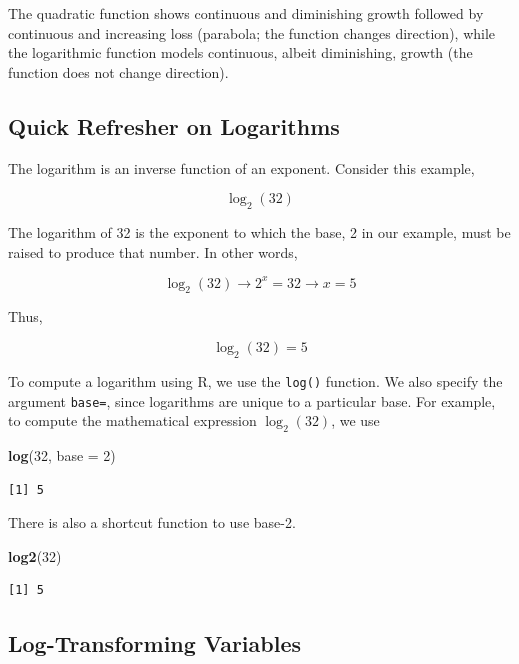 \documentclass[]{book}
\newenvironment{Shaded}{\begin{snugshade}}{\end{snugshade}}
\newcommand{\DataTypeTok}[1]{\textcolor[rgb]{0.13,0.29,0.53}{#1}}
\newcommand{\DecValTok}[1]{\textcolor[rgb]{0.00,0.00,0.81}{#1}}
\newcommand{\KeywordTok}[1]{\textcolor[rgb]{0.13,0.29,0.53}{\textbf{#1}}}
\newcommand{\NormalTok}[1]{#1}
\begin{document}
The quadratic function shows continuous and diminishing growth followed by continuous and increasing loss (parabola; the function changes direction), while the logarithmic function models continuous, albeit diminishing, growth (the function does not change direction).

\hypertarget{quick-refresher-on-logarithms}{%
\subsection{Quick Refresher on Logarithms}\label{quick-refresher-on-logarithms}}

The logarithm is an inverse function of an exponent. Consider this example,

\[
\log_2 (32)
\]

The logarithm of 32 is the exponent to which the base, 2 in our example, must be raised to produce that number. In other words,

\[
\log_2 (32) \longrightarrow 2^{x} = 32 \longrightarrow x=5
\]

Thus,

\[
\log_2 (32) = 5
\]

To compute a logarithm using R, we use the \texttt{log()} function. We also specify the argument \texttt{base=}, since logarithms are unique to a particular base. For example, to compute the mathematical expression \(\log_2 (32)\), we use

\begin{Shaded}
\begin{Highlighting}[]
\KeywordTok{log}\NormalTok{(}\DecValTok{32}\NormalTok{, }\DataTypeTok{base =} \DecValTok{2}\NormalTok{)}
\end{Highlighting}
\end{Shaded}

\begin{verbatim}
[1] 5
\end{verbatim}

There is also a shortcut function to use base-2.

\begin{Shaded}
\begin{Highlighting}[]
\KeywordTok{log2}\NormalTok{(}\DecValTok{32}\NormalTok{)}
\end{Highlighting}
\end{Shaded}

\begin{verbatim}
[1] 5
\end{verbatim}

\hypertarget{log-transforming-variables}{%
\subsection{Log-Transforming Variables}\label{log-transforming-variables}}
\end{document}
